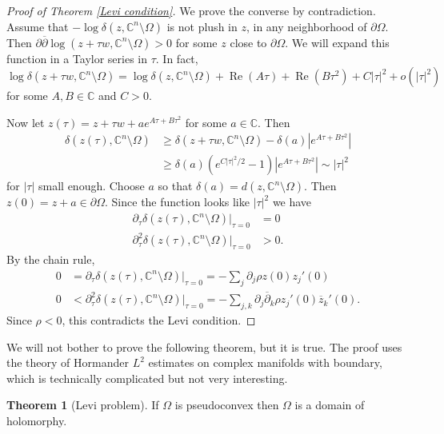 \documentclass[12pt]{report}
\newcommand{\CC}{\mathbb{C}}
\newcommand{\dbar}{\overline \partial}
\renewcommand{\Re}{\operatorname{Re}}
\theoremstyle{definition}
\newtheorem{theorem}{Theorem}[chapter]
\begin{document}
\begin{proof}[Proof of Theorem \ref{Levi condition}]
    We prove the converse by contradiction. Assume that $-\log \delta(z, \CC^n \setminus \Omega)$ is not plush in $z$, in any neighborhood of $\partial \Omega$. Then $\partial \dbar \log(z + \tau w, \CC^n \setminus \Omega) > 0$ for some $z$ close to $\partial \Omega$. We will expand this function in a Taylor series in $\tau$. In fact,
    $$\log \delta(z + \tau w, \CC^n \setminus \Omega) = \log \delta(z, \CC^n \setminus \Omega) + \Re (A \tau) + \Re (B \tau^2) + C|\tau|^2 + o(|\tau|^2)$$
    for some $A, B \in \CC$ and $C > 0$.

    Now let $z(\tau) = z + \tau w + ae^{A\tau + B\tau^2}$ for some $a \in \CC$. Then
\begin{align*}
    \delta(z(\tau), \CC^n \setminus \Omega) &\geq \delta(z + \tau w, \CC^n \setminus \Omega) - \delta(a)|e^{A\tau + B\tau^2}|\\
    &\geq \delta(a) (e^{C|\tau|^2/2} - 1)|e^{A\tau + B\tau^2}| \sim |\tau|^2
\end{align*}
    for $|\tau|$ small enough. Choose $a$ so that $\delta(a) = d(z, \CC^n \setminus \Omega)$. Then $z(0) = z + a \in \partial \Omega$. Since the function looks like $|\tau|^2$ we have
\begin{align*}\partial_\tau \delta(z(\tau), \CC^n \setminus \Omega)|_{\tau = 0} &= 0\\
\partial_\tau^2 \delta(z(\tau), \CC^n \setminus \Omega)|_{\tau = 0} &> 0.
\end{align*}
    By the chain rule,
\begin{align*}
    0 &= \partial_\tau \delta(z(\tau), \CC^n \setminus \Omega)|_{\tau = 0} = -\sum_j \partial_j \rho z(0) z_j'(0)\\
    0 &< \partial_\tau^2 \delta(z(\tau), \CC^n \setminus \Omega)|_{\tau = 0} = -\sum_{j,k} \partial_j \dbar_k \rho z_j'(0) \overline z_k'(0).
\end{align*}
    Since $\rho < 0$, this contradicts the Levi condition.
\end{proof}
    We will not bother to prove the following theorem, but it is true. The proof uses the theory of Hormander $L^2$ estimates on complex manifolds with boundary, which is technically complicated but not very interesting.
\begin{theorem}[Levi problem]
    If $\Omega$ is pseudoconvex then $\Omega$ is a domain of holomorphy.
\end{theorem}
\end{document}
